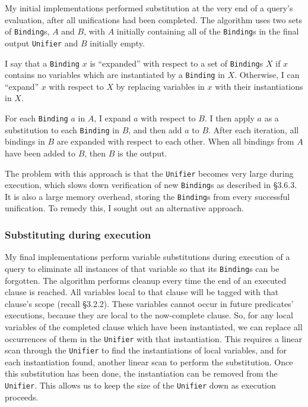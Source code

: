 \documentclass[12pt]{article}
\begin{document}
My initial implementations performed substitution at the very end of a query's evaluation, after all unifications had been completed. 
The algorithm uses two sets of \verb|Binding|s, $A$ and $B$, with $A$ initially containing all of the \verb|Binding|s in the final output \verb|Unifier| and $B$ initially empty.

I say that a \verb|Binding| $x$ is ``expanded'' with respect to a set of \verb|Binding|s $X$ if $x$ contains no variables which are instantiated by a \verb|Binding| in $X$. 
Otherwise, I can ``expand'' $x$ with respect to $X$ by replacing variables in $x$ with their instantiations in $X$.

For each \verb|Binding| $a$ in $A$, I expand $a$ with respect to $B$. 
I then apply $a$ as a substitution to each \verb|Binding| in $B$, and then add $a$ to $B$. 
After each iteration, all bindings in $B$ are expanded with respect to each other. 
When all bindings from $A$ have been added to $B$, then $B$ is the output.

The problem with this approach is that the \verb|Unifier| becomes very large during execution, which slows down verification of new \verb|Binding|s as described in \S3.6.3. 
It is also a large memory overhead, storing the \verb|Binding|s from every successful unification.
To remedy this, I sought out an alternative approach.

\subsubsection{Substituting during execution}

My final implementations perform variable substitutions during execution of a query to eliminate all instances of that variable so that its \verb|Binding|s can be forgotten.
The algorithm performs cleanup every time the end of an executed clause is reached.
All variables local to that clause will be tagged with that clause's scope (recall \S3.2.2).
These variables cannot occur in future predicates' executions, because they are local to the now-complete clause.
So, for any local variables of the completed clause which have been instantiated, we can replace all occurrences of them in the \verb|Unifier| with that instantiation. 
This requires a linear scan through the \verb|Unifier| to find the instantiations of local variables, and for each instantiation found, another linear scan to perform the substitution.
Once this substitution has been done, the instantiation can be removed from the \verb|Unifier|.
This allows us to keep the size of the \verb|Unifier| down as execution proceeds.
\end{document}
